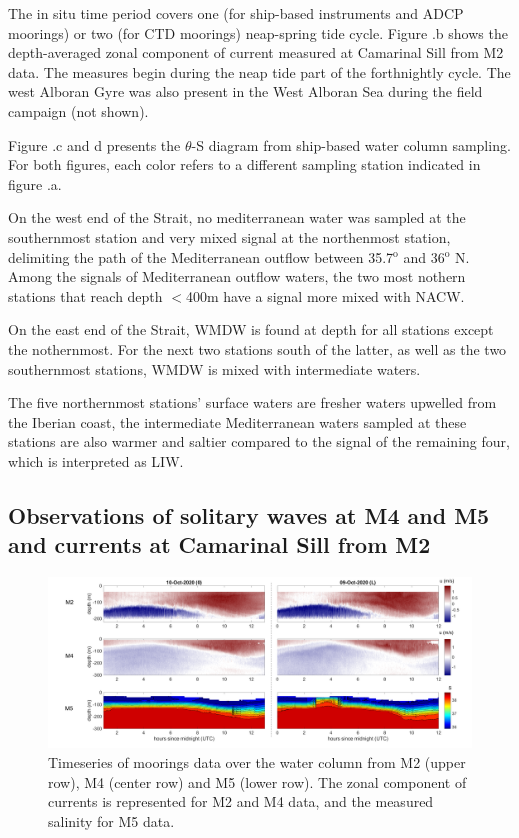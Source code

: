 The in situ time period covers one (for ship-based instruments and ADCP moorings) or two (for CTD moorings) neap-spring tide cycle. Figure .b shows the depth-averaged zonal component of current measured at Camarinal Sill from M2 data. The measures begin during the neap tide part of the forthnightly cycle. The west Alboran Gyre was also present in the West Alboran Sea during the field campaign (not shown). 

Figure .c and d presents the $\theta$-S diagram from ship-based water column sampling. For both figures, each color refers to a different sampling station indicated in figure .a.

On the west end of the Strait, no mediterranean water was sampled at the southernmost station and very mixed signal at the northenmost station, delimiting the path of the Mediterranean outflow between 35.7$^{\text{o}}$ and 36$^{\text{o}}$ N. Among the signals of Mediterranean outflow waters, the two most nothern stations that reach depth $<$400m have a signal more mixed with NACW.

On the east end of the Strait, WMDW is found at depth for all stations except the nothernmost. For the next two stations south of the latter, as well as the two southernmost stations, WMDW is mixed with intermediate waters. 

The five northernmost stations' surface waters are fresher waters upwelled from the Iberian coast, the intermediate Mediterranean waters sampled at these stations are also warmer and saltier compared to the signal of the remaining four, which is interpreted as LIW.



\subsection{Observations of solitary waves at M4 and M5 and currents at Camarinal Sill from M2}
\label{section_obs_moor}

\begin{figure}[!h]
 \includegraphics[width=\textwidth]{./GBR3D/US_moorings1.png}
 \caption {Timeseries of moorings data over the water column from M2 (upper row), M4 (center row) and M5 (lower row). The zonal component of currents is represented for M2 and M4 data, and the measured salinity for M5 data.}
 \label{fig_moor_US1}
\end{figure}

